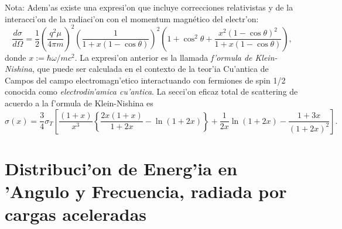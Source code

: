 Nota: Adem'as existe una expresi'on que incluye correcciones relativistas y de la interacci'on de la radiaci'on con el momentum magn\'{e}tico del electr'on:
\begin{equation}
\frac{d\sigma }{d\Omega}=\frac{1}{2}\left(\frac{q^2\mu}{4\pi m}\right)^2
\left(  \frac{1}{1+x\left(  1-\cos
\theta\right)  }\right)  ^{2}\left(  1+\cos^{2}\theta+\frac{x^{2}\left(
1-\cos\theta\right)  ^{2}}{1+x\left(  1-\cos\theta\right)  }\right),
\end{equation}
donde $x:={\hbar\omega}/{mc^{2}}$. La expresi'on anterior es la llamada \textit{f'ormula de Klein-Nishina}, que puede ser calculada en el contexto de la teor'ia Cu'antica de Campos del campo electromagn'etico interactuando con fermiones de spin 1/2 conocida como \textit{electrodin'amica cu'antica}.
La secci'on eficaz total de scattering de acuerdo a la f'ormula de Klein-Nishina es
\begin{equation}
 \sigma(x)=\frac{3}{4}\sigma_T\left[\frac{(1+x)}{x^3}\left\lbrace\frac{2x(1+x)}{1+2x}-\ln(1+2x)\right\rbrace+\frac{1}{2x}\ln(1+2x)-\frac{1+3x}{(1+2x)^2}\right].
\end{equation}



%
%



\section{Distribuci'on de Energ'ia en 'Angulo y Frecuencia, radiada
por cargas aceleradas}

